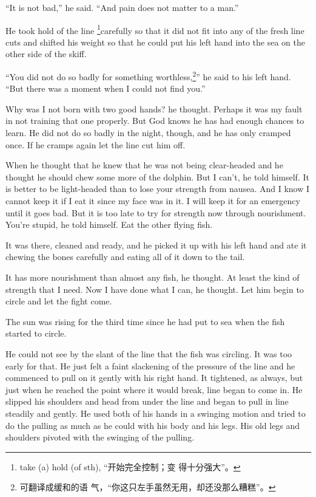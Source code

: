 \documentclass[fontset=ubuntu,zihao=-4]{ctexrep}
\begin{document}
``It is not bad,'' he said. ``And pain does not matter to a man.''

He took hold of the line \footnote{take (a) hold (of sth), “开始完全控制；变
  得十分强大”。}carefully so that it did not fit into any of the fresh line
cuts and shifted his weight so that he could put his left hand into the sea
on the other side of the skiff.

``You did not do so badly for something worthless,\footnote{可翻译成缓和的语
  气，“你这只左手虽然无用，却还没那么糟糕”。}'' he said to his left hand.
``But there was a moment when I could not find you.''

Why was I not born with two good hands? he thought. Perhaps it was my fault
in not training that one properly. But God knows he has had enough chances
to learn. He did not do so badly in the night, though, and he has only
cramped once. If he cramps again let the line cut him off.

When he thought that he knew that he was not being \gls{clear-headed} and he
thought he should chew some more of the dolphin. But I can't, he told
himself. It is better to be \gls{light-headed} than to lose your strength from
\gls{nausea}. And I know I cannot keep it if I eat it since my face was in it. I
will keep it for an \gls{emergency} until it goes bad. But it is too late to try
for strength now through \gls{nourishment}. You're stupid, he told himself. Eat
the other flying fish.

It was there, cleaned and ready, and he picked it up with his left hand and
ate it chewing the bones carefully and eating all of it down to the tail.

It has more nourishment than almost any fish, he thought. At least the kind
of strength that I need. Now I have done what I can, he thought. Let him
begin to circle and let the fight come.

The sun was rising for the third time since he had put to sea when the fish
started to circle.

He could not see by the slant of the line that the fish was circling. It was
too early for that. He just felt a faint \gls{slackening} of the pressure of
the line and he commenced to pull on it gently with his right hand. It
tightened, as always, but just when he reached the point where it would
break, line began to come in. He slipped his shoulders and head from under
the line and began to pull in line steadily and gently. He used both of his
hands in a swinging motion and tried to do the pulling as much as he could
with his body and his legs. His old legs and shoulders pivoted with the
swinging of the pulling.
\end{document}
